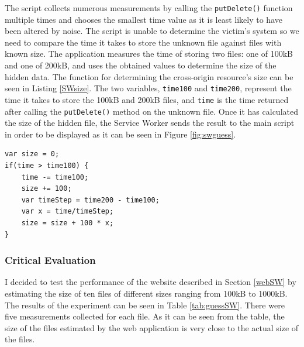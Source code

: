\documentclass[10pt,a4paper,twoside]{book}
\begin{document}
The script collects numerous measurements by calling the \texttt{putDelete()} function multiple times and chooses the smallest time value as it is least likely to have been altered by noise. The script is unable to determine the victim's system so we need to compare the time it takes to store the unknown file against files with known size. The application measures the time of storing two files: one of 100kB and one of 200kB, and uses the obtained values to determine the size of the hidden data. The function for determining the cross-origin resource's size can be seen in Listing \ref{SWsize}. The two variables, \texttt{time100} and \texttt{time200}, represent the time it takes to store the 100kB and 200kB files, and \texttt{time} is the time returned after calling the \texttt{putDelete()} method on the unknown file. Once it has calculated the size of the hidden file, the Service Worker sends the result to the main script in order to be displayed as it can be seen in Figure \ref{fig:swguess}.

\begin{lstlisting}[caption={JavaScript code for estimating the size of a file.},label={SWsize}]
var size = 0;
if(time > time100) {
    time -= time100;
    size += 100;
    var timeStep = time200 - time100;
    var x = time/timeStep;
    size = size + 100 * x;
}
\end{lstlisting}

\subsubsection{Critical Evaluation}

I decided to test the performance of the website described in Section \ref{webSW} by estimating the size of ten files of different sizes ranging from 100kB to 1000kB. The results of the experiment can be seen in Table \ref{tab:guessSW}. There were five measurements collected for each file. As it can be seen from the table, the size of the files estimated by the web application is very close to the actual size of the files.
\end{document}
